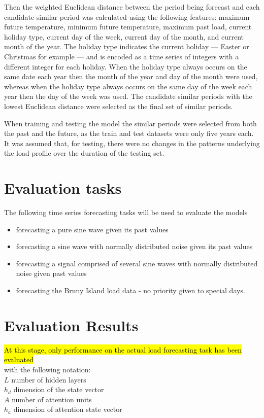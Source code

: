 Then the weighted Euclidean distance between the period being forecast and each candidate similar period was calculated using the following features: 
maximum future temperature, 
minimum future temperature,
maximum past load,
current holiday type, 
current day of the week,
current day of the month, and
current month of the year.
The holiday type indicates the current holiday --- Easter or Christmas for example --- and is encoded as a time series of integers with a different integer for each holiday.
When the holiday type always occurs on the same date each year then the month of the year and day of the month were used, whereas when the holiday type always occurs on the same day of the week each year then the day of the week was used.
The candidate similar periods with the lowest Euclidean distance were selected as the final set of similar periods.

When training and testing the model the similar periods were selected from both the past and the future, as the train and test datasets were only five years each.
It was assumed that, for testing, there were no changes in the patterns underlying the load profile over the duration of the testing set.

\section{Evaluation tasks}
The following time series forecasting tasks will be used to evaluate the models
\begin{itemize}
	\item forecasting a pure sine wave given its past values
	\item forecasting a sine wave with normally distributed noise given its past values
	\item forecasting a signal comprised of several sine waves with normally distributed noise given past values
	\item forecasting the Bruny Island load data - no priority given to special days.
\end{itemize}

\section{Evaluation Results}
\hl{At this stage, only performance on the actual load forecasting task has been evaluated} \\
with the following notation: \\
$L$ number of hidden layers \\
$h_d$ dimension of the state vector \\
$A$ number of attention units \\
$h_a$ dimension of attention state vector


